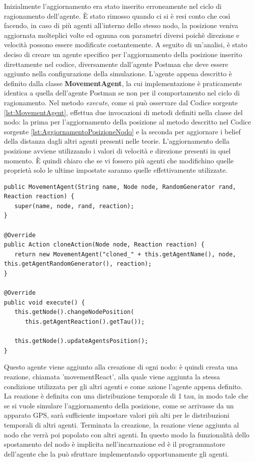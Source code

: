 \documentclass[12pt,a4paper,openright,twoside]{report}
\begin{document}
Inizialmente l'aggiornamento era stato inserito erroneamente nel ciclo di ragionamento dell'agente. \`E stato rimosso quando ci si \`e resi conto che cos\`i facendo, in caso di pi\`u agenti all'interno dello stesso nodo, la posizione veniva aggiornata molteplici volte ed ognuna con parametri diversi poich\`e direzione e velocit\`a possono essere modificate costantemente.
A seguito di un'analisi, \`e stato deciso di creare un agente specifico per l'aggiornamento della posizione inserito direttamente nel codice, diversamente dall'agente Postman che deve essere aggiunto nella configurazione della simulazione.
L'agente appena descritto \`e definito dalla classe \textbf{MovementAgent}, la cui implementazione \`e praticamente identica a quella dell'agente Postman se non per il comportamento nel ciclo di ragionamento.
Nel metodo \textit{execute}, come si pu\`o osservare dal Codice sorgente \ref{lst:MovementAgent}, effettua due invocazioni di metodi definiti nella classe del nodo: la prima per l'aggiornamento della posizione al metodo descritto nel Codice sorgente \ref{lst:AggiornamentoPosizioneNodo} e la seconda per aggiornare i belief della distanza dagli altri agenti presenti nelle teorie.
L'aggiornamento della posizione avviene utilizzando i valori di velocit\`a e direzione presenti in quel momento. \`E quindi chiaro che se vi fossero pi\`u agenti che modifichino quelle propriet\`a solo le ultime impostate saranno quelle effettivamente utilizzate.
\medskip
\begin{lstlisting}[label={lst:MovementAgent},caption={Agente per lo spostamento del nodo}]
public MovementAgent(String name, Node node, RandomGenerator rand, Reaction reaction) {
   super(name, node, rand, reaction);
}

@Override
public Action cloneAction(Node node, Reaction reaction) {
   return new MovementAgent("cloned_" + this.getAgentName(), node, this.getAgentRandomGenerator(), reaction);
}

@Override
public void execute() {
   this.getNode().changeNodePosition(
      this.getAgentReaction().getTau());

   this.getNode().updateAgentsPosition();
}
\end{lstlisting}

Questo agente viene aggiunto alla creazione di ogni nodo: \`e quindi creata una reazione, chiamata 'movementReact', alla quale viene aggiunta la stessa condizione utilizzata per gli altri agenti e come azione l'agente appena definito. La reazione \`e definita con una distribuzione temporale di 1 tau, in modo tale che se si vuole simulare l'aggiornamento della posizione, come se arrivasse da un apparato GPS, sar\`a sufficiente impostare valori pi\`u alti per le distribuzioni temporali di altri agenti.
Terminata la creazione, la reazione viene aggiunta al nodo che verr\`a poi popolato con altri agenti. In questo modo la funzionalit\`a dello spostamento del nodo \`e implicita nell'incarnazione ed \`e il programmatore dell'agente che la pu\`o sfruttare implementando opportunamente gli agenti.
\end{document}
